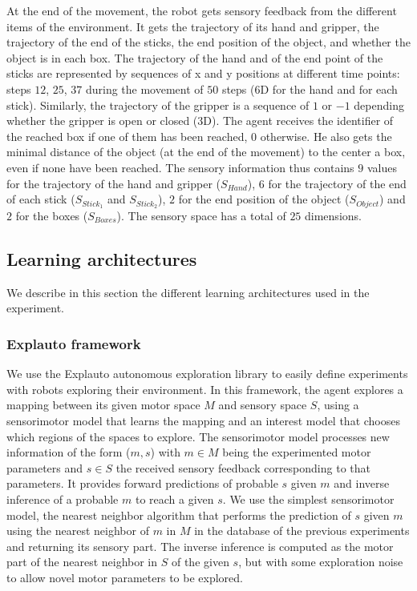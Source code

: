 \documentclass[10pt,letterpaper]{article}
\begin{document}
			At the end of the movement, the robot gets sensory feedback from the different items of the environment.
			It gets the trajectory of its hand and gripper, the trajectory of the end of the sticks, 
			the end position of the object, and whether the object is in each box.		
			The trajectory of the hand and of the end point of the sticks are represented by sequences of x and y positions at different time points: 
			steps $12$, $25$, $37$ during the movement of $50$ steps ($6$D for the hand and for each stick).
			Similarly, the trajectory of the gripper is a sequence of $1$ or $-1$ depending whether the gripper is open or closed ($3$D).
			The agent receives the identifier of the reached box if one of them has been reached, 0 otherwise. He also gets the minimal distance of the object (at the end of the movement) to the center a box, even if none have been reached.
			The sensory information thus contains $9$ values for the trajectory of the hand and gripper ($S_{Hand}$), $6$ for the trajectory of the end of each stick ($S_{Stick_1}$ and $S_{Stick_2}$), $2$ for the end position of the object ($S_{Object}$) and $2$ for the boxes ($S_{Boxes}$).
			The sensory space has a total of $25$ dimensions.
			
		
	
	\subsection{Learning architectures}

		We describe in this section the different learning architectures used in the experiment. 
		
		\subsubsection{Explauto framework}
			
			We use the Explauto autonomous exploration library \cite{moulin-frier_explauto:_2014} to easily define experiments with robots exploring their environment. 
			In this framework, the agent explores a mapping between its given motor space $M$ and sensory space $S$, 
			using a sensorimotor model that learns the mapping and an interest model that chooses which regions of the spaces to explore.
			The sensorimotor model processes new information of the form ($m, s$) with $m \in M$ being the experimented motor parameters and $s \in S$ the received sensory feedback 
			corresponding to that parameters. 
			It provides forward predictions of probable $s$ given $m$ and inverse inference of a probable $m$ to reach a given $s$.
			We use the simplest sensorimotor model, the nearest neighbor algorithm 
			that performs the prediction of $s$ given $m$ using the nearest neighbor of $m$ in $M$ in the database of the previous experiments and returning its sensory part. 
			The inverse inference is computed as the motor part of the nearest neighbor in $S$ of the given $s$, but with some exploration noise to allow novel motor parameters to be explored.
			
\end{document}
